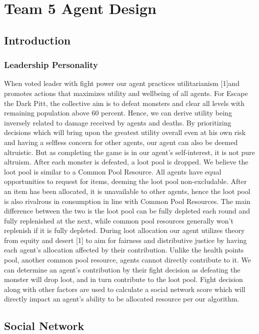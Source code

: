 \useunder{\uline}{\ul}{}
\chapter{Team 5 Agent Design}\label{team_5_agent_design}
\section{Introduction}
\subsection{Leadership Personality}
\noindent When voted leader with fight power our agent practices utilitarianism [1]and promotes actions that maximizes utility and wellbeing of all agents. For Escape the Dark Pitt, the collective aim is to defeat monsters and clear all levels with remaining population above 60 percent. Hence, we can derive utility being inversely related to damage received by agents and deaths. By prioritizing decisions which will bring upon the greatest utility overall even at his own risk and having a selfless concern for other agents, our agent can also be deemed altruistic. But as completing the game is in our agent’s self-interest, it is not pure altruism.
\medskip
\noindent After each monster is defeated, a loot pool is dropped. We believe the loot pool is similar to a Common Pool Resource. All agents have equal opportunities to request for items, deeming the loot pool non-excludable. After an item has been allocated, it is unavailable to other agents, hence the loot pool is also rivalrous in consumption in line with Common Pool Resources. The main difference between the two is the loot pool can be fully depleted each round and fully replenished at the next, while common pool resources generally won’t replenish if it is fully depleted. During loot allocation our agent utilizes theory from equity and desert [1] to aim for fairness and distributive justice by having each agent’s allocation affected by their contribution. Unlike the health points pool, another common pool resource, agents cannot directly contribute to it. We can determine an agent’s contribution by their fight decision as defeating the monster will drop loot, and in turn contribute to the loot pool. Fight decision along with other factors are used to calculate a social network score which will directly impact an agent’s ability to be allocated resource per our algorithm.

\section{Social Network}

